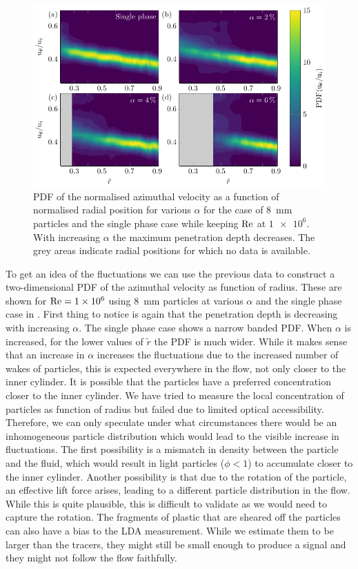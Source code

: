 \begin{figure}
\centering%
\includegraphics{figure8.pdf}%
\caption{%
\label{fig:heatmap}
PDF of the normalised azimuthal velocity as a function of normalised radial
position for various $\alpha$ for the case of \SI{8}{\milli\metre} particles
and the single phase case while keeping $\text{Re}$ at $\num{1e6}$. With increasing
$\alpha$ the maximum penetration depth decreases. The grey areas indicate
radial positions for which no data is available.
}
\end{figure}

To get an idea of the fluctuations we can use the previous data to construct a
two-dimensional PDF of the azimuthal velocity as function of radius. These are
shown for $\text{Re} = \num{1e6}$ using \SI{8}{\milli\metre} particles at various
$\alpha$ and the single phase case in .  First thing
to notice is again that the penetration depth is decreasing with increasing
$\alpha$.  The single phase case shows a narrow banded PDF. When $\alpha$ is
increased, for the lower values of $\tilde{r}$ the PDF is much wider.  While
it makes sense that an increase in $\alpha$ increases the fluctuations due to
the increased number of wakes of particles, this is expected everywhere in the
flow, not only closer to the inner cylinder.  It is possible that the
particles have a preferred concentration closer to the inner cylinder.  We
have tried to measure the local concentration of particles as function of
radius but failed due to limited optical accessibility.  Therefore, we can
only speculate under what circumstances there would be an inhomogeneous
particle distribution which would lead to the visible increase in
fluctuations.  The first possibility is a mismatch in density between the
particle and the fluid, which would result in light particles ($\phi < 1$) to
accumulate closer to the inner cylinder.  Another possibility is that due to
the rotation of the particle, an effective lift force arises, leading to a
different particle distribution in the flow. While this is quite plausible,
this is difficult to validate as we would need to capture the rotation.  The
fragments of plastic that are sheared off the particles can also have a bias
to the LDA measurement. While we estimate them to be larger than the tracers,
they might still be small enough to produce a signal and they might not follow
the flow faithfully.


